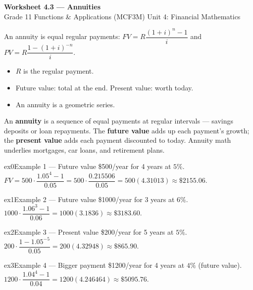 \documentclass[11pt]{article}
\begin{document}
\begin{center}
{\LARGE\bfseries\color{titleblue}Worksheet 4.3 --- Annuities}\\[2pt]
{\small Grade 11 Functions \& Applications (MCF3M) \textperiodcentered{} Unit 4: Financial Mathematics}
\end{center}

\begin{ideabox}
An annuity is equal regular payments: $FV=R\dfrac{(1+i)^n-1}{i}$ and $PV=R\dfrac{1-(1+i)^{-n}}{i}$.
\begin{itemize}[leftmargin=*,itemsep=2pt]
  \item $R$ is the regular payment.
  \item Future value: total at the end. Present value: worth today.
  \item An annuity is a geometric series.
\end{itemize}
\end{ideabox}

\begin{learnbox}
An \textbf{annuity} is a sequence of equal payments at regular intervals — savings deposits or loan repayments.
The \textbf{future value} adds up each payment's growth; the \textbf{present value} adds each payment discounted to today.
Annuity math underlies mortgages, car loans, and retirement plans.
\end{learnbox}


\begin{example}{ex0}{Example 1 --- Future value}
\$500/year for 4 years at $5\%$.\soln $FV=500\cdot\dfrac{1.05^4-1}{0.05}=500\cdot\dfrac{0.215506}{0.05}=500(4.31013)\approx\$2155.06$.
\end{example}

\begin{example}{ex1}{Example 2 --- Future value}
\$1000/year for 3 years at $6\%$.\soln $1000\cdot\dfrac{1.06^3-1}{0.06}=1000(3.1836)\approx\$3183.60$.
\end{example}

\begin{example}{ex2}{Example 3 --- Present value}
\$200/year for 5 years at $5\%$.\soln $200\cdot\dfrac{1-1.05^{-5}}{0.05}=200(4.32948)\approx\$865.90$.
\end{example}

\begin{example}{ex3}{Example 4 --- Bigger payment}
\$1200/year for 4 years at $4\%$ (future value).\soln $1200\cdot\dfrac{1.04^4-1}{0.04}=1200(4.246464)\approx\$5095.76$.
\end{example}
\end{document}
